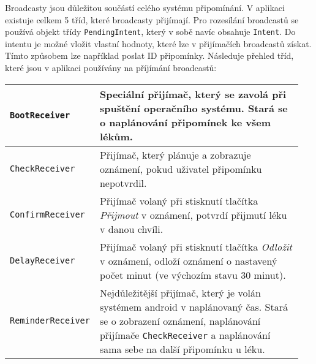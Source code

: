 \documentclass[../TakeYourPill.tex]{subfiles}
\begin{document}

Broadcasty jsou důležitou součástí celého systému připomínání. V aplikaci existuje celkem 5 tříd, které broadcasty přijímají. Pro rozesílání broadcastů se používá objekt třídy \texttt{PendingIntent}, který v sobě navíc obsahuje \texttt{Intent}. Do intentu je možné vložit vlastní hodnoty, které lze v přijímačích broadcastů získat. Tímto způsobem lze například poslat ID připomínky. Následuje přehled tříd, které jsou v aplikaci používány na příjímání broadcastů:

\begin{table}[h!]
\centering
  \begin{tabular}{ |p{0.25\linewidth} | p{0.70\linewidth}| }
    \hline
    \texttt{BootReceiver} & Speciální přijímač, který se zavolá při spuštění operačního systému. Stará se o naplánování připomínek ke všem lékům.\\
    \hline
    \texttt{CheckReceiver} & Přijímač, který plánuje a zobrazuje oznámení, pokud uživatel připomínku nepotvrdil. \\
    \hline
    \texttt{ConfirmReceiver} & Přijímač volaný při stisknutí tlačítka \textit{Přijmout} v oznámení, potvrdí přijmutí léku v danou chvíli. \\
    \hline
    \texttt{DelayReceiver} & Přijímač volaný při stisknutí tlačítka \textit{Odložit} v oznámení, odloží oznámení o nastavený počet minut (ve výchozím stavu 30 minut). \\
    \hline
    \texttt{ReminderReceiver} & Nejdůležitější přijímač, který je volán systémem android v naplánovaný čas. Stará se o zobrazení oznámení, naplánování přijímače \texttt{CheckReceiver} a naplánování sama sebe na další připomínku u léku. \\
    \hline
  \end{tabular}
\end{table}
\end{document}

